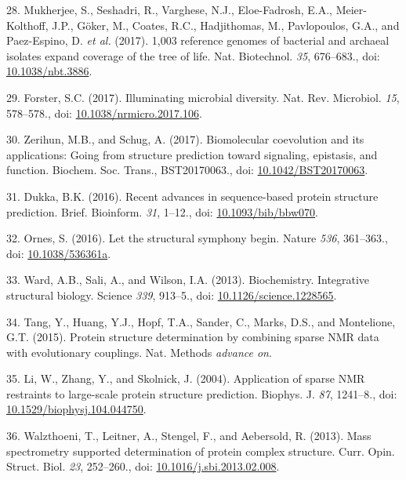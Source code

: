 \documentclass[11pt,a4paper,twoside]{book}
\theoremstyle{definition}
\theoremstyle{definition}
\theoremstyle{remark}
\begin{document}
\hypertarget{ref-Mukherjee2017}{}
28. Mukherjee, S., Seshadri, R., Varghese, N.J., Eloe-Fadrosh, E.A.,
Meier-Kolthoff, J.P., Göker, M., Coates, R.C., Hadjithomas, M.,
Pavlopoulos, G.A., and Paez-Espino, D. \emph{et al.} (2017). 1,003
reference genomes of bacterial and archaeal isolates expand coverage of
the tree of life. Nat. Biotechnol. \emph{35}, 676--683., doi:
\href{https://doi.org/10.1038/nbt.3886}{10.1038/nbt.3886}.

\hypertarget{ref-Forster2017}{}
29. Forster, S.C. (2017). Illuminating microbial diversity. Nat. Rev.
Microbiol. \emph{15}, 578--578., doi:
\href{https://doi.org/10.1038/nrmicro.2017.106}{10.1038/nrmicro.2017.106}.

\hypertarget{ref-Zerihun2017}{}
30. Zerihun, M.B., and Schug, A. (2017). Biomolecular coevolution and
its applications: Going from structure prediction toward signaling,
epistasis, and function. Biochem. Soc. Trans., BST20170063., doi:
\href{https://doi.org/10.1042/BST20170063}{10.1042/BST20170063}.

\hypertarget{ref-BKC2016}{}
31. Dukka, B.K. (2016). Recent advances in sequence-based protein
structure prediction. Brief. Bioinform. \emph{31}, 1--12., doi:
\href{https://doi.org/10.1093/bib/bbw070}{10.1093/bib/bbw070}.

\hypertarget{ref-Ornes2016}{}
32. Ornes, S. (2016). Let the structural symphony begin. Nature
\emph{536}, 361--363., doi:
\href{https://doi.org/10.1038/536361a}{10.1038/536361a}.

\hypertarget{ref-Ward2013}{}
33. Ward, A.B., Sali, A., and Wilson, I.A. (2013). Biochemistry.
Integrative structural biology. Science \emph{339}, 913--5., doi:
\href{https://doi.org/10.1126/science.1228565}{10.1126/science.1228565}.

\hypertarget{ref-Tang2015}{}
34. Tang, Y., Huang, Y.J., Hopf, T.A., Sander, C., Marks, D.S., and
Montelione, G.T. (2015). Protein structure determination by combining
sparse NMR data with evolutionary couplings. Nat. Methods \emph{advance
on}.

\hypertarget{ref-Li2004}{}
35. Li, W., Zhang, Y., and Skolnick, J. (2004). Application of sparse
NMR restraints to large-scale protein structure prediction. Biophys. J.
\emph{87}, 1241--8., doi:
\href{https://doi.org/10.1529/biophysj.104.044750}{10.1529/biophysj.104.044750}.

\hypertarget{ref-Walzthoeni2013}{}
36. Walzthoeni, T., Leitner, A., Stengel, F., and Aebersold, R. (2013).
Mass spectrometry supported determination of protein complex structure.
Curr. Opin. Struct. Biol. \emph{23}, 252--260., doi:
\href{https://doi.org/10.1016/j.sbi.2013.02.008}{10.1016/j.sbi.2013.02.008}.
\end{document}
